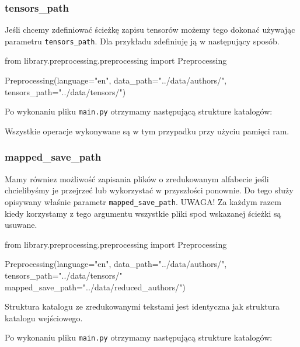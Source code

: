 \newpage
\subsubsection{tensors\_path}
Jeśli chcemy zdefiniować ścieżkę zapisu tensorów możemy tego dokonać używając parametru 
\texttt{tensors\_path}. Dla przykładu zdefiniuję ją w następujący sposób. 
\begin{python}
from library.preprocessing.preprocessing import Preprocessing

Preprocessing(language="en",
              data_path="../data/authors/",
              tensors_path="../data/tensors/")
                   
\end{python}

Po wykonaniu pliku \texttt{main.py} otrzymamy następującą strukture katalogów:
\myspace
{}
\myspace

Wszystkie operacje wykonywane są w tym przypadku przy użyciu pamięci ram.


\subsubsection{mapped\_save\_path}
Mamy równiez możliwość zapisania plików o zredukowanym alfabecie jeśli chcielibyśmy je przejrzeć lub
wykorzystać w przyszłości ponownie. Do tego służy opisywany właśnie parametr \texttt{mapped\_save\_path}.
UWAGA! Za każdym razem kiedy korzystamy z tego argumentu wszystkie pliki spod wskazanej ścieżki są 
usuwane.

\begin{python}
from library.preprocessing.preprocessing import Preprocessing

Preprocessing(language="en",
              data_path="../data/authors/",
              tensors_path="../data/tensors/"
              mapped_save_path="../data/reduced_authors/")
                   
\end{python}
Struktura katalogu ze zredukowanymi tekstami jest identyczna jak struktura katalogu wejściowego. 

Po wykonaniu pliku \texttt{main.py} otrzymamy następującą strukture katalogów:

\myspace
{}
\myspace

